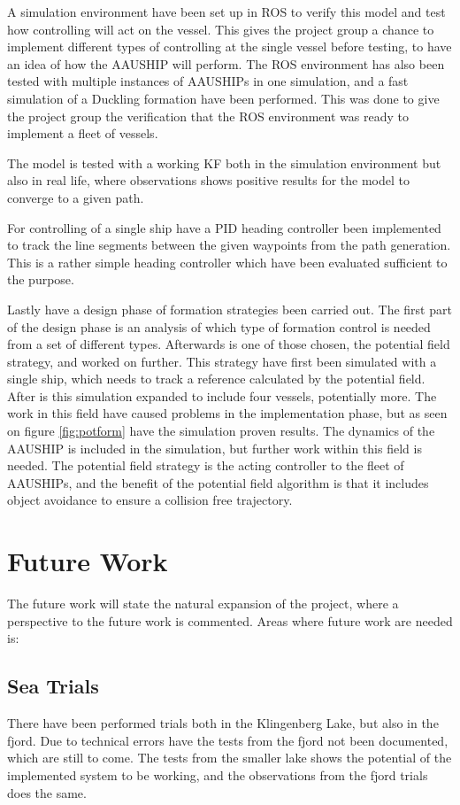 A simulation environment have been set up in \ac{ROS} to verify this model and test how controlling will act on the vessel. This gives the project group a chance to implement different types of controlling at the single vessel before testing, to have an idea of how the AAUSHIP will perform. The \ac{ROS} environment has also been tested with multiple instances of AAUSHIPs in one simulation, and a fast simulation of a Duckling formation have been performed. This was done to give the project group the verification that the \ac{ROS} environment was ready to implement a fleet of vessels.

The model is tested with a working \ac{KF} both in the simulation environment but also in real life, where observations shows positive results for the model to converge to a given path.

For controlling of a single ship have a PID heading controller been implemented to track the line segments between the given waypoints from the path generation. This is a rather simple heading controller which have been evaluated sufficient to the purpose.

Lastly have a design phase of formation strategies been carried out. The first part of the design phase is an analysis of which type of formation control is needed from a set of different types. Afterwards is one of those chosen, the potential field strategy, and worked on further. This strategy have first been simulated with a single ship, which needs to track a reference calculated by the potential field. After is this simulation expanded to include four vessels, potentially more. The work in this field have caused problems in the implementation phase, but as seen on figure \ref{fig:potform} have the simulation proven results. The dynamics of the AAUSHIP is included in the simulation, but further work within this field is needed. The potential field strategy is the acting controller to the fleet of AAUSHIPs, and the benefit of the potential field algorithm is that it includes object avoidance to ensure a collision free trajectory.


\section{Future Work}
The future work will state the natural expansion of the project, where a perspective to the future work is commented. Areas where future work are needed is:

\subsection{Sea Trials}
There have been performed trials both in the Klingenberg Lake, but also in the fjord. Due to technical errors have the tests from the fjord not been documented, which are still to come. The tests from the smaller lake shows the potential of the implemented system to be working, and the observations from the fjord trials does the same.

